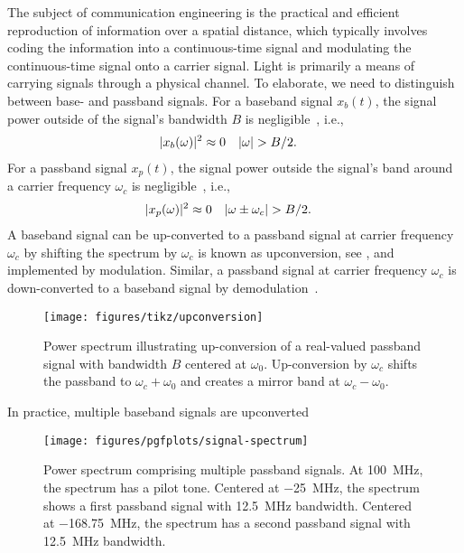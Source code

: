 The subject of communication engineering is the practical and efficient reproduction of information over a spatial distance, which typically involves coding the information into a continuous-time signal and modulating the continuous-time signal onto a carrier signal.
Light is primarily a means of carrying signals through a physical channel.
To elaborate, we need to distinguish between base- and passband signals.
For a baseband signal $x_b(t)$, the signal power outside of the signal's bandwidth $B$ is negligible~\cite[p.~15]{Madhow2008}, i.e.,
\begin{align}
	\lvert x_b(\omega)\rvert^2
	&\approx
	0
	&
	\lvert\omega\rvert
	&>
	B/2
	.
\end{align}
For a passband signal $x_p(t)$, the signal power outside the signal's band around a carrier frequency $\omega_c$ is negligible~\cite[p.~16]{Madhow2008}, i.e.,
\begin{align}
	\lvert x_p(\omega)\rvert^2
	&\approx
	0
	&
	\lvert\omega\pm\omega_c\rvert
	&>
	B/2
	.	
\end{align}
A baseband signal can be up-converted to a passband signal at carrier frequency $\omega_c$ by shifting the spectrum by $\omega_c$ is known as upconversion, see , and implemented by modulation.
Similar, a passband signal at carrier frequency $\omega_c$ is down-converted to a baseband signal by demodulation~\cite[p.~26]{Madhow2008}.
\begin{figure}[ht]
	\centering
	\texttt{[image: figures/tikz/upconversion]}
	\caption{Power spectrum illustrating up-conversion of a real-valued passband signal with bandwidth $B$ centered at $\omega_0$. Up-conversion by $\omega_c$ shifts the passband to $\omega_c+\omega_0$ and creates a mirror band at $\omega_c-\omega_0$.}\label{fig:upconversion}
\end{figure}
In practice, multiple baseband signals are upconverted
\begin{figure}[ht]
	\centering
	\texttt{[image: figures/pgfplots/signal-spectrum]}
	\caption{Power spectrum comprising multiple passband signals. At \SI{+100}{\mega\hertz}, the spectrum has a pilot tone. Centered at \SI{-25}{\mega\hertz}, the spectrum shows a first passband signal with \SI{12.5}{\mega\hertz} bandwidth. Centered at \SI{-168.75}{\mega\hertz}, the spectrum has a second passband signal with \SI{12.5}{\mega\hertz} bandwidth.}\label{fig:signal_spectrum}
\end{figure}

